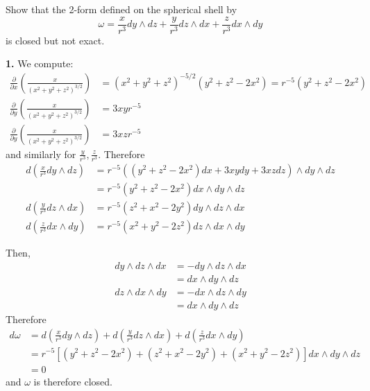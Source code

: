\documentclass[a4paper, 12pt]{article}
\begin{document}
\begin{problem} 
Show that the 2-form defined on the spherical shell by \[
    \omega = \frac{x}{r^3}dy \wedge dz + \frac{y}{r^3}dz \wedge dx + \frac{z}{r^3} dx \wedge dy
\]
is closed but not exact.
\end{problem}
\begin{solution}
    \textbf{1.} We compute:
    \begin{align*}
        \frac{\partial }{\partial x} \left(\frac{x}{(x^2 + y^2 + z^2)^{3/2}}\right)  &= (x^2 + y^2 + z^2)^{-5/2}(y^2 + z^2 -2x^2) = r^{-5}(y^2 + z^2 -2x^2) \\
        \frac{\partial }{\partial y} \left(\frac{x}{(x^2 + y^2 + z^2)^{3/2}}\right) & =3xyr^{-5} \\
        \frac{\partial }{\partial y} \left(\frac{x}{(x^2 + y^2 + z^2)^{3/2}}\right) & =3xzr^{-5}
    \end{align*}
    and similarly for $\frac{y}{r^3}, \frac{z}{r^3}$. Therefore \begin{align*}
    d\left(\frac{x}{r^3} dy \wedge dz\right) &= r^{-5} ((y^2 + z^2 - 2x^2) dx + 3xy dy + 3xz dz) \wedge dy \wedge dz \\
    &= r^{-5} (y^2 + z^2 - 2x^2)dx \wedge dy \wedge dz \\
    d\left(\frac{y}{r^3} dz \wedge dx \right) &= r^{-5} (z^2 + x^2 - 2y^2) dy \wedge dz \wedge dx \\
    d\left(\frac{z}{r^3} dx \wedge dy \right) &= r^{-5} (x^2 + y^2 - 2z^2) dz \wedge dx \wedge dy
    \end{align*}

    Then, \begin{align*}
    dy \wedge dz \wedge dx &= - dy \wedge dz \wedge dx \\
    &= dx \wedge dy \wedge dz \\
    dz \wedge dx \wedge dy &= - dx \wedge dz \wedge dy \\
    &= dx \wedge dy \wedge dz
    \end{align*}
    Therefore 
    \begin{align*}
    d\omega &= d\left(\frac{x}{r^3} dy \wedge dz\right) + d\left(\frac{y}{r^3} dz \wedge dx \right) +  d\left(\frac{z}{r^3} dx \wedge dy \right) \\
    &= r^{-5}[(y^2 + z^2 - 2x^2) + (z^2 + x^2 - 2y^2) + (x^2 + y^2 - 2z^2)] dx \wedge dy \wedge dz \\
    &= 0
    \end{align*}
    and $\omega$ is therefore closed. 


\end{solution}
\end{document}
